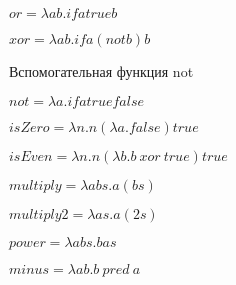 ~\

~\

\begin{solution}

$or = \lambda ab. if a true b$

$xor = \lambda ab. if a (not b) b$

Вспомогательная функция not

$not = \lambda a. if a true false$

$isZero = \lambda n. n (\lambda a. false)true$

$isEven = \lambda n. n (\lambda b. b \: xor \: true) true$

$multiply = \lambda abs. a(bs)$

$multiply2 = \lambda as. a(2s)$

$power = \lambda abs.bas$

$minus = \lambda ab.b \: pred \: a$


\end{solution}